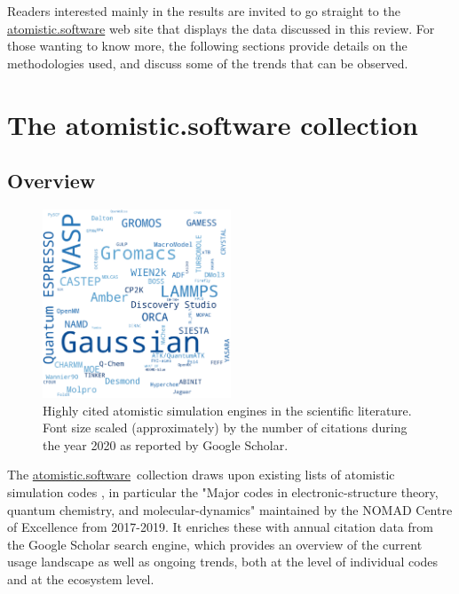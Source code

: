 \documentclass[9pt,review]{livecoms}
\newcommand{\atsoft}{\href{https://atomistic.software}{atomistic.software}\ }
\begin{document}
Readers interested mainly in the results are invited to go straight to the \href{atomistic.software}{atomistic.software} web site that displays the data discussed in this review.
For those wanting to know more, the following sections provide details on the methodologies used, and discuss some of the trends that can be observed.



\section{The atomistic.software collection}


\subsection{Overview}

\begin{figure}
    \includegraphics[width=0.5\textwidth]{figures/wordcloud_trim}
    \caption{
        Highly cited atomistic simulation engines in the scientific literature. 
        Font size scaled (approximately) by the number of citations during the year 2020 as reported by Google Scholar.
    }
    \label{fig:wordcloud}
\end{figure}

The \atsoft collection draws upon existing lists of atomistic simulation codes \cite{qm-codes-wiki,mm-codes-wiki,sklog-wiki,Pirhadi2016}, in particular the "Major codes in electronic-structure theory, quantum chemistry, and molecular-dynamics" \cite{Ghiringhelli2017} maintained by the NOMAD Centre of Excellence from 2017-2019. 
It enriches these with annual citation data from the Google Scholar search engine, which provides an overview of the current usage landscape as well as ongoing trends, both at the level of individual codes and at the ecosystem level.
\end{document}
